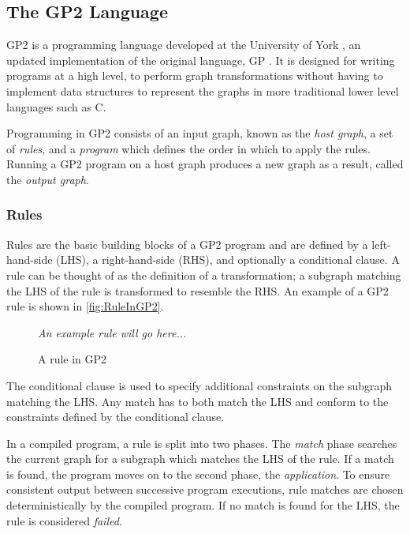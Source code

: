 \documentclass[authoryearcitations]{UoYCSproject}
\begin{document}
\subsection{The GP2 Language}
\label{sec:TheGP2Language}

GP2 is a programming language developed at the University of York \citep{bak2015},
an updated implementation of the original language, GP \citep{plump2009}. It is
designed for writing programs at a high level, to perform graph transformations 
without having to implement data structures to represent the graphs in more
traditional lower level languages such as C.

Programming in GP2 consists of an input graph, known as the \emph{host graph}, a
set of \emph{rules}, and a \emph{program} which defines the order in which to
apply the rules. Running a GP2 program on a host graph produces a new graph as
a result, called the \emph{output graph}.

\subsubsection{Rules}
\label{sec:Rules}

Rules are the basic building blocks of a GP2 program and are defined by a
left-hand-side (LHS), a right-hand-side (RHS), and optionally a conditional
clause. A rule can be thought of as the definition of a transformation; a subgraph
matching the LHS of the rule is transformed to resemble the RHS. An example of a
GP2 rule is shown in \autoref{fig:RuleInGP2}.

\begin{figure}
    \begin{center}
        \emph{An example rule will go here...}
    \end{center}
    \caption{A rule in GP2}
    \label{fig:RuleInGP2}
\end{figure}

The conditional clause is used to specify additional constraints on the subgraph
matching the LHS. Any match has to both match the LHS and conform to the constraints
defined by the conditional clause.

In a compiled program, a rule is split into two phases. The \emph{match} phase
searches the current graph for a subgraph which matches the LHS of the rule. If
a match is found, the program moves on to the second phase, the \emph{application}.
To ensure consistent output between successive program executions, rule matches are
chosen deterministically by the compiled program. If no match is found for the LHS,
the rule is considered \emph{failed}.
\end{document}
